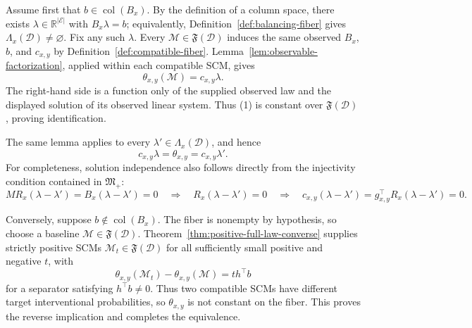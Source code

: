 Assume first that \(b\in\operatorname{col}(B_x)\). By the definition of a column space, there exists \(\lambda\in\mathbb R^{\lvert\mathcal E\rvert}\) with \(B_x\lambda=b\); equivalently, Definition~\ref{def:balancing-fiber} gives \(\Lambda_x(\mathcal D)\ne\varnothing\). Fix any such \(\lambda\). Every \(\mathcal M\in\mathfrak F(\mathcal D)\) induces the same observed \(B_x\), \(b\), and \(c_{x,y}\) by Definition~\ref{def:compatible-fiber}. Lemma~\ref{lem:observable-factorization}, applied within each compatible SCM, gives
\[
\theta_{x,y}(\mathcal M)=c_{x,y}\lambda.
\tag{1}
\]
The right-hand side is a function only of the supplied observed law and the displayed solution of its observed linear system. Thus (1) is constant over \(\mathfrak F(\mathcal D)\), proving identification.

The same lemma applies to every \(\lambda'\in\Lambda_x(\mathcal D)\), and hence
\[
c_{x,y}\lambda=\theta_{x,y}=c_{x,y}\lambda'.
\tag{2}
\]
For completeness, solution independence also follows directly from the injectivity condition contained in \(\mathfrak M_{+}\):
\[
M R_x(\lambda-\lambda')=B_x(\lambda-\lambda')=0
\quad\Longrightarrow\quad
R_x(\lambda-\lambda')=0
\quad\Longrightarrow\quad
c_{x,y}(\lambda-\lambda')=g_{x,y}^{\top}R_x(\lambda-\lambda')=0.
\tag{3}
\]

Conversely, suppose \(b\notin\operatorname{col}(B_x)\). The fiber is nonempty by hypothesis, so choose a baseline \(\mathcal M\in\mathfrak F(\mathcal D)\). Theorem~\ref{thm:positive-full-law-converse} supplies strictly positive SCMs \(\mathcal M_t\in\mathfrak F(\mathcal D)\) for all sufficiently small positive and negative \(t\), with
\[
\theta_{x,y}(\mathcal M_t)-\theta_{x,y}(\mathcal M)=t h^{\top}b
\tag{4}
\]
for a separator satisfying \(h^{\top}b\ne0\). Thus two compatible SCMs have different target interventional probabilities, so \(\theta_{x,y}\) is not constant on the fiber. This proves the reverse implication and completes the equivalence.